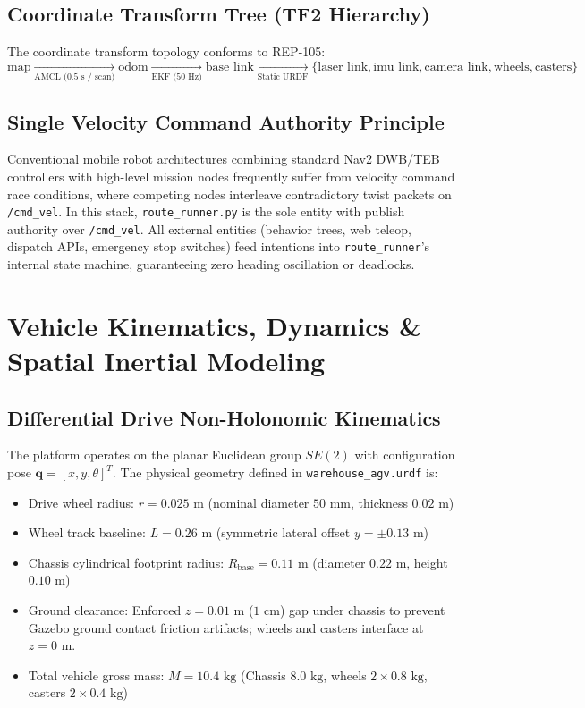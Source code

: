 \documentclass[10pt,a4paper]{article}
\begin{document}
\subsection{Coordinate Transform Tree (TF2 Hierarchy)}
The coordinate transform topology conforms to REP-105:
\begin{equation}
\text{map} \xrightarrow[\text{AMCL (0.5 s / scan)}]{} \text{odom} \xrightarrow[\text{EKF (50 Hz)}]{} \text{base\_link} \xrightarrow[\text{Static URDF}]{} \{\text{laser\_link}, \text{imu\_link}, \text{camera\_link}, \text{wheels}, \text{casters}\}
\end{equation}

\subsection{Single Velocity Command Authority Principle}
Conventional mobile robot architectures combining standard Nav2 DWB/TEB controllers with high-level mission nodes frequently suffer from velocity command race conditions, where competing nodes interleave contradictory twist packets on \texttt{/cmd\_vel}. In this stack, \texttt{route\_runner.py} is the sole entity with publish authority over \texttt{/cmd\_vel}. All external entities (behavior trees, web teleop, dispatch APIs, emergency stop switches) feed intentions into \texttt{route\_runner}'s internal state machine, guaranteeing zero heading oscillation or deadlocks.

\section{Vehicle Kinematics, Dynamics \& Spatial Inertial Modeling}

\subsection{Differential Drive Non-Holonomic Kinematics}
The platform operates on the planar Euclidean group $SE(2)$ with configuration pose $\mathbf{q} = [x, y, \theta]^T$. The physical geometry defined in \texttt{warehouse\_agv.urdf} is:
\begin{itemize}
    \item Drive wheel radius: $r = 0.025\text{ m}$ (nominal diameter $50\text{ mm}$, thickness $0.02\text{ m}$)
    \item Wheel track baseline: $L = 0.26\text{ m}$ (symmetric lateral offset $y = \pm 0.13\text{ m}$)
    \item Chassis cylindrical footprint radius: $R_{\text{base}} = 0.11\text{ m}$ (diameter $0.22\text{ m}$, height $0.10\text{ m}$)
    \item Ground clearance: Enforced $z = 0.01\text{ m}$ ($1\text{ cm}$) gap under chassis to prevent Gazebo ground contact friction artifacts; wheels and casters interface at $z = 0\text{ m}$.
    \item Total vehicle gross mass: $M = 10.4\text{ kg}$ (Chassis $8.0\text{ kg}$, wheels $2 \times 0.8\text{ kg}$, casters $2 \times 0.4\text{ kg}$)
\end{itemize}
\end{document}
